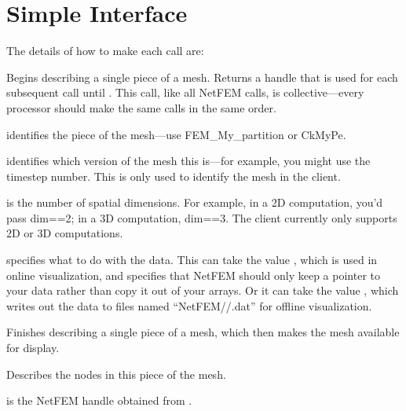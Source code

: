 \documentclass[10pt]{article}
\begin{document}
\section{Simple Interface}
The details of how to make each call are:


Begins describing a single piece of a mesh.  Returns a handle
that is used for each subsequent call until .  
This call, like all NetFEM calls, is collective---every processor 
should make the same calls in the same order.

 identifies the piece of the mesh---use FEM\_My\_partition
or CkMyPe.

 identifies which version of the mesh this is---for example,
you might use the timestep number.  This is only used to identify the
mesh in the client.

 is the number of spatial dimensions.  For example, in a 2D
computation, you'd pass dim==2; in a 3D computation, dim==3.
The client currently only supports 2D or 3D computations.

 specifies what to do with the data.  This can
take the value , which is used in online visualization,
and specifies that NetFEM should only keep a pointer to your data 
rather than copy it out of your arrays.  Or it can take the value
, which writes out the data to files named
``NetFEM//.dat'' for offline visualization. 



Finishes describing a single piece of a mesh, which 
then makes the mesh available for display.



Describes the nodes in this piece of the mesh.

 is the NetFEM handle obtained from .
\end{document}

